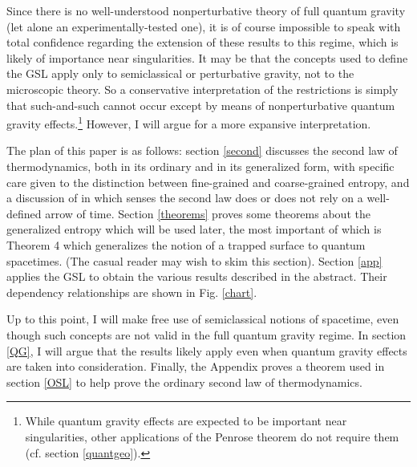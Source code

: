 \documentclass[12pt]{article}
\begin{document}
Since there is no well-understood nonperturbative theory of full quantum gravity (let alone an experimentally-tested one), it is of course impossible to speak with total confidence regarding the extension of these results to this regime, which is likely of importance near singularities.  It may be that the concepts used to define the GSL apply only to semiclassical or perturbative gravity, not to the microscopic theory.  So a conservative interpretation of the restrictions is simply that such-and-such cannot occur except by means of nonperturbative quantum gravity effects.\footnote{While quantum gravity effects are expected to be important near singularities, other applications of the Penrose theorem do not require them (cf. section \ref{quantgeo}).} However, I will argue for a more expansive interpretation.

The plan of this paper is as follows: section \ref{second} discusses the second law of thermodynamics, both in its ordinary and in its generalized form, with specific care given to the distinction between fine-grained and coarse-grained entropy, and a discussion of in which senses the second law does or does not rely on a well-defined arrow of time.  Section \ref{theorems} proves some theorems about the generalized entropy which will be used later, the most important of which is Theorem 4 which generalizes the notion of a trapped surface to quantum spacetimes.  (The casual reader may wish to skim this section).  Section \ref{app} applies the GSL to obtain the various results described in the abstract.  
Their dependency relationships are shown in Fig. \ref{chart}.

Up to this point, I will make free use of semiclassical notions of spacetime, even though such concepts are not valid in the full quantum gravity regime.  In section \ref{QG}, I will argue that the results likely apply even when quantum gravity effects are taken into consideration.  Finally, the Appendix proves a theorem used in section \ref{OSL} to help prove the ordinary second law of thermodynamics.
\end{document}
